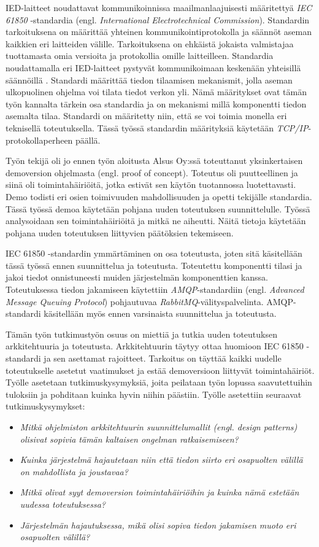 IED-laitteet noudattavat kommunikoinnissa maailmanlaajuisesti määritettyä \emph{IEC 61850} -standardia (engl. \emph{International Electrotechnical Commission}). Standardin tarkoituksena on määrittää yhteinen kommunikointiprotokolla ja säännöt aseman kaikkien eri laitteiden välille. Tarkoituksena on ehkäistä jokaista valmistajaa tuottamasta omia versioita ja protokollia omille laitteilleen. Standardia noudattamalla eri IED-laitteet pystyvät kommunikoimaan keskenään yhteisillä säännöillä \cite[s.~624]{Mackiewicz2006}. Standardi määrittää tiedon tilaamisen mekanismit, jolla aseman ulkopuolinen ohjelma voi tilata tiedot verkon yli. Nämä määritykset ovat tämän työn kannalta tärkein osa standardia ja on mekanismi millä komponentti tiedon asemalta tilaa. Standardi on määritetty niin, että se voi toimia monella eri teknisellä toteutuksella. Tässä työssä standardin määrityksiä käytetään \emph{TCP/IP}-protokollaperheen päällä.

Työn tekijä oli jo ennen työn aloitusta Alsus Oy:ssä toteuttanut yksinkertaisen demoversion ohjelmasta (engl. proof of concept). Toteutus oli puutteellinen ja siinä oli toimintahäiriöitä, jotka estivät sen käytön tuotannossa luotettavasti. Demo todisti eri osien toimivuuden mahdollisuuden ja opetti tekijälle standardia. Tässä työssä demoa käytetään pohjana uuden toteutuksen suunnittelulle. Työssä analysoidaan sen toimintahäiriöitä ja mitkä ne aiheutti. Näitä tietoja käytetään pohjana uuden toteutuksen liittyvien päätöksien tekemiseen.

IEC 61850 -standardin ymmärtäminen on osa toteutusta, joten sitä käsitellään tässä työssä ennen suunnittelua ja toteutusta. Toteutettu komponentti tilasi ja jakoi tiedot onnistuneesti muiden järjestelmän komponenttien kanssa. Toteutuksessa tiedon jakamiseen käytettiin \emph{AMQP}-standardiin (engl. \emph{Advanced Message Queuing Protocol}) pohjautuvaa \emph{RabbitMQ}-välityspalvelinta. AMQP-standardi käsitellään myös ennen varsinaista suunnittelua ja toteutusta.

Tämän työn tutkimustyön osuus on miettiä ja tutkia uuden toteutuksen arkkitehtuuria ja toteutusta. Arkkitehtuurin täytyy ottaa huomioon IEC 61850 -standardi ja sen asettamat rajoitteet. Tarkoitus on täyttää kaikki uudelle toteutukselle asetetut vaatimukset ja estää demoversioon liittyvät toimintahäiriöt. Työlle asetetaan tutkimuskysymyksiä, joita peilataan työn lopussa saavutettuihin tuloksiin ja pohditaan kuinka hyvin niihin päästiin. Työlle asetettiin seuraavat tutkimuskysymykset:
\begin{itemize}
	\item \emph{Mitkä ohjelmiston arkkitehtuurin suunnittelumallit (engl. design patterns) olisivat sopivia tämän kaltaisen ongelman ratkaisemiseen?}
	\item \emph{Kuinka järjestelmä hajautetaan niin että tiedon siirto eri osapuolten välillä on mahdollista ja joustavaa?}
	\item \emph{Mitkä olivat syyt demoversion toimintahäiriöihin ja kuinka nämä estetään uudessa toteutuksessa?}
	\item \emph{Järjestelmän hajautuksessa, mikä olisi sopiva tiedon jakamisen muoto eri osapuolten välillä?}
\end{itemize}


